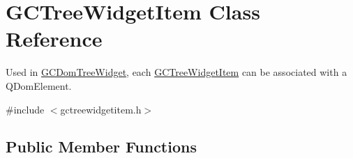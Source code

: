 \hypertarget{class_g_c_tree_widget_item}{\section{\-G\-C\-Tree\-Widget\-Item \-Class \-Reference}
\label{class_g_c_tree_widget_item}
}


\-Used in \hyperlink{class_g_c_dom_tree_widget}{\-G\-C\-Dom\-Tree\-Widget}, each \hyperlink{class_g_c_tree_widget_item}{\-G\-C\-Tree\-Widget\-Item} can be associated with a \-Q\-Dom\-Element.  




{\ttfamily \#include $<$gctreewidgetitem.\-h$>$}

\subsection*{\-Public \-Member \-Functions}

